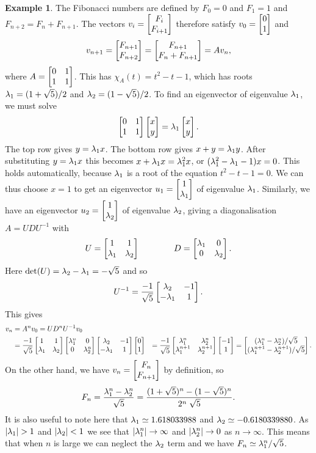 \documentclass[reqno]{amsart}
\theoremstyle{definition}
\newtheorem{example}[theorem]{Example}
\begin{document}
\begin{example}\label{eg-fibonacci}
 The Fibonacci numbers are defined by $F_0=0$ and $F_1=1$ and
 $F_{n+2}=F_n+F_{n+1}$.  The vectors $v_i=\left[\begin{matrix} F_i\\ F_{i+1}\end{matrix}\right]$
 therefore satisfy $v_0=\left[\begin{matrix} 0\\1\end{matrix}\right]$ and
 \[ v_{n+1}=\left[\begin{matrix} F_{n+1}\\F_{n+2}\end{matrix}\right] =
     \left[\begin{matrix} F_{n+1}\\ F_n+F_{n+1} \end{matrix}\right] = Av_n,
 \]
 where $A=\left[\begin{matrix} 0&1\\1&1\end{matrix}\right]$.  This has $\chi_A(t)=t^2-t-1$, which has
 roots $\lambda_1=(1+\sqrt{5})/2$ and $\lambda_2=(1-\sqrt{5})/2$.  To find an
 eigenvector of eigenvalue $\lambda_1$, we must solve
 \[ \left[\begin{matrix} 0 & 1 \\ 1 & 1 \end{matrix}\right] \left[\begin{matrix} x \\ y \end{matrix}\right] =
     \lambda_1\left[\begin{matrix} x \\ y \end{matrix}\right].
 \]
 The top row gives $y=\lambda_1 x$.  The bottom row gives $x+y=\lambda_1y$.
 After substituting $y=\lambda_1x$ this becomes $x+\lambda_1x=\lambda_1^2x$, or
 $(\lambda_1^2-\lambda_1-1)x=0$.  This holds automatically, because $\lambda_1$ is
 a root of the equation $t^2-t-1=0$.  We can thus choose $x=1$ to get
 an eigenvector $u_1=\left[\begin{matrix} 1\\ \lambda_1\end{matrix}\right]$ of eigenvalue $\lambda_1$.
 Similarly, we have an eigenvector $u_2=\left[\begin{matrix} 1\\ \lambda_2\end{matrix}\right]$ of
 eigenvalue $\lambda_2$, giving a diagonalisation $A=UDU^{-1}$ with 
 \[ U = \left[\begin{matrix} 1&1 \\ \lambda_1 & \lambda_2 \end{matrix}\right] \hspace{4em}
    D = \left[\begin{matrix} \lambda_1 & 0 \\ 0 & \lambda_2 \end{matrix}\right].
 \] 
 Here $\det(U)=\lambda_2-\lambda_1=-\sqrt{5}$ and so 
 \[ U^{-1} = \frac{-1}{\sqrt{5}}
     \left[\begin{matrix} \lambda_2 & - 1 \\ -\lambda_1 & 1\end{matrix}\right].
 \]
 This gives 
 \begin{align*}
  v_n &= A^nv_0 = UD^nU^{-1}v_0 \\
      &= \frac{-1}{\sqrt{5}}
         \left[\begin{matrix} 1&1 \\ \lambda_1 & \lambda_2 \end{matrix}\right]
         \left[\begin{matrix} \lambda_1^n & 0 \\ 0 & \lambda_2^n \end{matrix}\right]
         \left[\begin{matrix} \lambda_2 & - 1 \\ -\lambda_1 & 1\end{matrix}\right] 
         \left[\begin{matrix} 0 \\ 1 \end{matrix}\right]
      &= \frac{-1}{\sqrt{5}}
         \left[\begin{matrix} \lambda_1^n & \lambda_2^n \\ \lambda_1^{n+1} & \lambda_2^{n+1} \end{matrix}\right]
         \left[\begin{matrix} -1 \\ 1 \end{matrix}\right] 
       = \left[\begin{matrix} (\lambda_1^n-\lambda_2^n)/\sqrt{5} \\
              (\lambda_1^{n+1}-\lambda_2^{n+1})/\sqrt{5} \end{matrix}\right]. 
 \end{align*}
 On the other hand, we have $v_n=\left[\begin{matrix} F_n\\ F_{n+1}\end{matrix}\right]$ by
 definition, so 
 \[ F_n = \frac{\lambda_1^n-\lambda_2^n}{\sqrt{5}} = 
     \frac{(1+\sqrt{5})^n-(1-\sqrt{5})^n}{2^n\;\sqrt{5}}.
 \]
 It is also useful to note here that $\lambda_1\simeq 1.618033988$ and
 $\lambda_2\simeq -0.6180339880$.  As $|\lm_1|>1$ and $|\lambda_2|<1$ we see
 that $|\lambda_1^n|\to\infty$ and $|\lambda_2^n|\to 0$ as $n\to\infty$.  This
 means that when $n$ is large we can neglect the $\lambda_2$ term and we
 have $F_n\simeq\lambda_1^n/\sqrt{5}$.  
\end{example}
\end{document}
